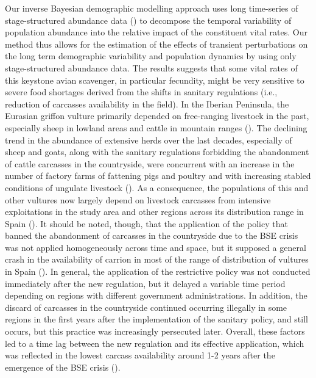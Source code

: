 \documentclass[12pt]{article}
\begin{document}
Our inverse Bayesian demographic modelling approach uses long time-series of stage-structured abundance data (\cite{Wood1994,Gross2002}) to decompose the temporal variability of population abundance into the relative impact of the constituent vital rates. Our method thus allows for the estimation of the effects of transient perturbations on the long term demographic variability and population dynamics by using only stage-structured abundance data. The results suggests that some vital rates of this keystone avian scavenger, in particular fecundity, might be very sensitive to severe food shortages derived from the shifts in sanitary regulations (i.e., reduction of carcasses availability in the field). In the Iberian Peninsula, the Eurasian griffon vulture primarily depended on free-ranging livestock in the past, especially sheep in lowland areas and cattle in mountain ranges (\cite{Donazar1993}). The declining trend in the abundance of extensive herds over the last decades, especially of sheep and goats, along with the sanitary regulations forbidding the abandonment of cattle carcasses in the countryside, were concurrent with an increase in the number of factory farms of fattening pigs and poultry and with increasing stabled conditions of ungulate livestock (\cite{Blanco2014}). As a consequence, the populations of this and other vultures now largely depend on livestock carcasses from intensive exploitations in the study area and other regions across its distribution range in Spain (\cite{Camina2006,Donazar2010,Blanco2019a}). It should be noted, though, that the application of the policy that banned the abandonment of carcasses in the countryside due to the BSE crisis was not applied homogeneously across time and space, but it supposed a general crash in the availability of carrion in most of the range of distribution of vultures in Spain (\cite{Donazar2009b,Margalida2010}). In general, the application of the restrictive policy was not conducted immediately after the new regulation, but it delayed a variable time period depending on regions with different government administrations. In addition, the discard of carcasses in the countryside continued occurring illegally in some regions in the first years after the implementation of the sanitary policy, and still occurs, but this practice was increasingly persecuted later. Overall, these factors led to a time lag between the new regulation and its effective application, which was reflected in the lowest carcass availability around 1-2 years after the emergence of the BSE crisis (\cite{Donazar2009b,Blanco2014}).\\
\end{document}

